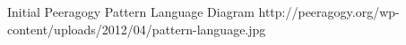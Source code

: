 Initial Peeragogy Pattern Language Diagram
http://peeragogy.org/wp-content/uploads/2012/04/pattern-language.jpg